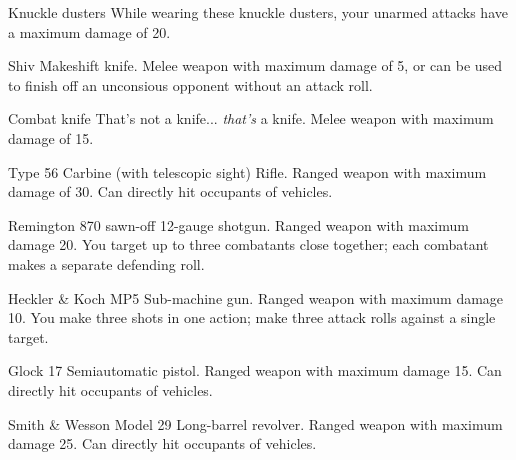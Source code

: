 
\begin{describe}{Knuckle dusters}
  While wearing these knuckle dusters, your unarmed attacks have a maximum damage of 20.
\end{describe}

\begin{describe}{Shiv}
  Makeshift knife. Melee weapon with maximum damage of 5, or can be used to finish off an unconsious opponent without an attack roll.
\end{describe}

\begin{describe}{Combat knife}
  That's not a knife... \emph{that's} a knife. Melee weapon with maximum damage of 15.
\end{describe}

\begin{describe}{Type 56 Carbine (with telescopic sight)}
  Rifle. Ranged weapon with maximum damage of 30. Can directly hit occupants of vehicles.
\end{describe}

\begin{describe}{Remington 870 sawn-off}
  12-gauge shotgun. Ranged weapon with maximum damage 20. You target up to three combatants close together; each combatant makes a separate defending roll.
\end{describe}

\begin{describe}{Heckler \& Koch MP5}
  Sub-machine gun. Ranged weapon with maximum damage 10. You make three shots in one action; make three attack rolls against a single target.
\end{describe}

\begin{describe}{Glock 17}
  Semiautomatic pistol. Ranged weapon with maximum damage 15. Can directly hit occupants of vehicles.
\end{describe}

\begin{describe}{Smith \& Wesson Model 29}
  Long-barrel revolver. Ranged weapon with maximum damage 25. Can directly hit occupants of vehicles.
\end{describe}

